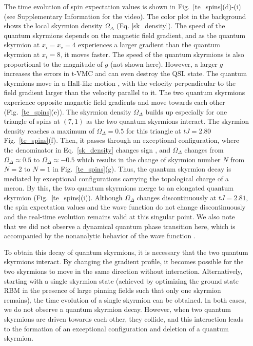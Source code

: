 \documentclass[aps,prb,twocolumn,superscriptaddress,a4paper,longbibliography]{revtex4-2}
\begin{document}
The time evolution of spin expectation values is shown in Fig.~\ref{te_spins}(d)-(i) (see Supplementary Information for the video). The color plot in the background shows the local skyrmion density $\Omega_\Delta$ (Eq. \eqref{sk_density}).
The speed of the quantum skyrmions depends on the magnetic field gradient, and as the quantum skyrmion at $x_i=x_c=4$ experiences a larger gradient than the quantum skyrmion at $x_i=8$, it moves faster. The speed of the quantum skyrmions is also proportional to the magnitude of $g$ (not shown here). However, a larger $g$ increases the errors in t-VMC and can even destroy the QSL state. The quantum skyrmions move in a Hall-like motion \cite{zhang_manipulation_2018}, with the velocity perpendicular to the field gradient larger than the velocity parallel to it. The two quantum skyrmions experience opposite magnetic field gradients and move towards each other (Fig.~\ref{te_spins}(e)). The skyrmion density $\Omega_\Delta$ builds up especially for one triangle of spins at $(7,1)$ as the two quantum skyrmions interact. The skyrmion density reaches a maximum of $\Omega_\Delta=0.5$  for this triangle at $tJ=2.80$ Fig.~\ref{te_spins}(f). Then, it passes through an exceptional configuration, where the denominator in Eq.~\eqref{sk_density} changes sign \cite{berg_definition_1981}, and $\Omega_\Delta$ changes from $\Omega_\Delta \approx 0.5$ to $\Omega_\Delta \approx -0.5$ which results in the change of skyrmion number $N$ from $N=2$ to $N=1$ in Fig.~\ref{te_spins}(g). Thus, the quantum skyrmion decay is mediated by exceptional configurations carrying the topological charge of a meron. By this, the two quantum skyrmions merge to an elongated quantum skyrmion (Fig.~\ref{te_spins}(i)). Although $\Omega_\Delta$ changes discontinuously at $tJ=2.81$, the spin expectation values and the wave function do not change discontinuously and the real-time evolution remains valid at this singular point. We also note that we did not observe a dynamical quantum phase transition here, which is accompanied by the nonanalytic behavior of the wave function \cite{vijayan_topological_2023}.

To obtain this decay of quantum skyrmions, it is necessary that the two quantum skyrmions interact. By changing the gradient profile, it becomes possible for the two skyrmions to move in the same direction without interaction. Alternatively, starting with a single skyrmion state (achieved by optimizing the ground state RBM in the presence of large pinning fields such that only one skyrmion remains), the time evolution of a single skyrmion can be obtained. In both cases, we do not observe a quantum skyrmion decay. However, when two quantum skyrmions are driven towards each other, they collide, and this interaction leads to the formation of an exceptional configuration and deletion of a quantum skyrmion.
\end{document}
